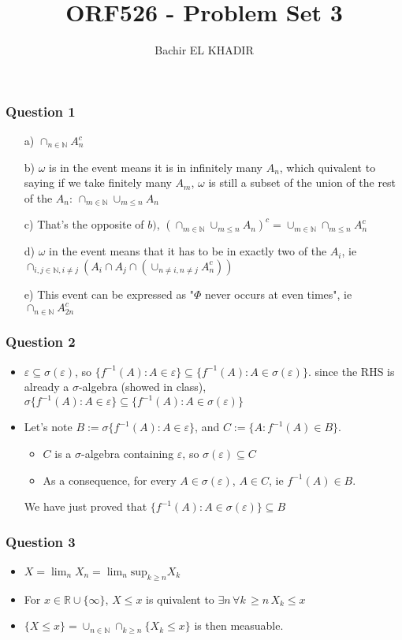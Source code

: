 \documentclass[12pt]{article}
\title{ORF526 - Problem Set 3}
\author{Bachir EL KHADIR }
\newcommand{\Q}[1]{\subsubsection*{Question #1}}
\newcommand{\salgebra}{$\sigma$-algebra }
\begin{document}
\maketitle

\Q{1}

\begin{itemize}
\item [a)] $\cap_{n \in \mathbb{N}} A_n^c$
\item [b)] $\omega$ is in the event means it is in infinitely many $A_n$, which quivalent to saying if we take finitely many $A_m$, $\omega$ is still a subset of the union of the rest of the $A_n$: $\cap_{m \in \mathbb{N}} \cup_{m \leq n} A_n$
\item [c)] That's the opposite of $b)$, $\left(\cap_{m \in \mathbb{N}} \cup_{m \leq n} A_n \right)^c = \cup_{m \in \mathbb{N}} \cap_{m \leq n} A_n^c $
\item [d)] $\omega$ in the event means that it has to be in exactly two of the $A_i$, ie $\cap_{ i,j \in \mathbb{N}, i \neq j} \left(A_i \cap A_j \cap (\cup_{n \neq i, n \neq j} A_n^c) \right)$
\item [e)] This event can be expressed as "$\Phi$ never occurs at even times", ie $\cap_{n \in \mathbb{N}} A_{2 n}^c$
\end{itemize}

\Q{2}
\begin{itemize}
\item $\varepsilon \subseteq \sigma(\varepsilon)$, so $\{ f^{-1}(A) : A \in \varepsilon \} \subseteq \{ f^{-1}(A) : A \in \sigma(\varepsilon) \}$. since the RHS is already a $\sigma$-algebra (showed in class), $\sigma \{ f^{-1}(A) : A \in \varepsilon \} \subseteq \{ f^{-1}(A) : A \in \sigma(\varepsilon) \}$
\item Let's note $B := \sigma \{ f^{-1}(A) : A \in \varepsilon \}$, and $C := \{ A: f^{-1}(A) \in B \}$.
\begin{itemize}
\item $C$ is a \salgebra containing $\varepsilon$, so $\sigma(\varepsilon) \subseteq C$
\item As a consequence, for every $A \in \sigma(\varepsilon)$, $A \in C$, ie $f^{-1}(A) \in B$.
\end{itemize}
We have just proved that $\{ f^{-1}(A) : A \in \sigma(\varepsilon) \}  \subseteq B$
\end{itemize}


\Q{3} 
\begin{itemize}
\item $X = \lim_n X_n = \lim_n \text{sup}_{k \geq n} X_k$
\item For $x \in  \mathbb{R} \cup \{ \infty \}$, $X \leq x$ is quivalent to $\exists n \, \forall k \, \geq n \, X_k \leq x$
\item $\{X \leq x\} = \cup_{n \in \mathbb{N}} \cap_{k \geq n} \{X_k \leq x \}$ is then measuable.
\end{itemize}
\end{document}
